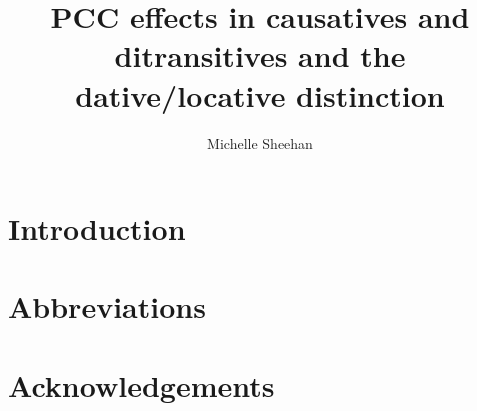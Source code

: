 \documentclass[output=paper,modfonts,nonflat]{langsci/langscibook}
\author{Michelle Sheehan	\affiliation{}}
\title{PCC effects in causatives and ditransitives and the dative/locative distinction}
\begin{document}
\section{Introduction}  
 
\section*{Abbreviations}
\section*{Acknowledgements}

\sloppy
\printbibliography[heading=subbibliography,notkeyword=this] 
\end{document}

